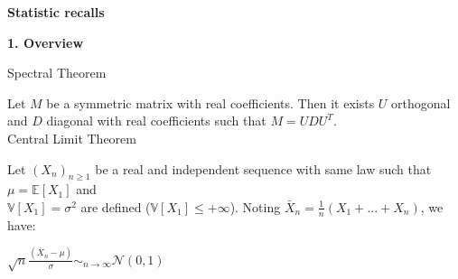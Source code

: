 {\fontsize{20pt}{22pt}\selectfont \textbf{Statistic recalls} \par}

\vspace{20mm}

{\fontsize{12pt}{22pt} \textbf{1. Overview}\par}

\vspace{5mm}

Spectral Theorem

Let $M$ be a symmetric matrix with real coefficients. Then it exists $U$ orthogonal and $D$ diagonal with real coefficients such that $M=UDU^T$. \\

Central Limit Theorem

Let $(X_n)_{n \ge 1}$ be a real and independent sequence with same law such that $\mu = \mathbb{E}[X_1]$ and \\
$\mathbb{V}[X_1]=\sigma^2$ are defined ($\mathbb{V}[X_1] \leq +\infty$). Noting $\bar{X}_n=\frac{1}{n}(X_1 + ... + X_n)$, we have:
\begin{center}
$\sqrt{n}\frac{(\bar{X}_n-\mu)}{\sigma} \sim_{n \to \infty} \mathcal{N}(0,1)$
\end{center}